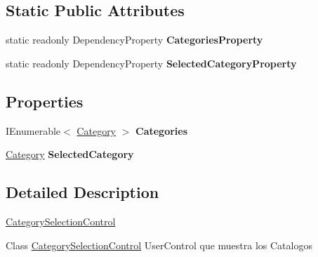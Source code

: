 \subsection*{Static Public Attributes}
\begin{DoxyCompactItemize}
\item 
static readonly Dependency\-Property {\bfseries Categories\-Property}
\item 
static readonly Dependency\-Property {\bfseries Selected\-Category\-Property}
\end{DoxyCompactItemize}
\subsection*{Properties}
\begin{DoxyCompactItemize}
\item 
\hypertarget{class_microsoft_1_1_samples_1_1_kinect_1_1_basic_interactions_1_1_category_selection_control_a0d1c37db047c0d3364ebcc52dd003e58}{I\-Enumerable$<$ \hyperlink{class_microsoft_1_1_samples_1_1_kinect_1_1_basic_interactions_1_1_category}{Category} $>$ {\bfseries Categories}}\label{class_microsoft_1_1_samples_1_1_kinect_1_1_basic_interactions_1_1_category_selection_control_a0d1c37db047c0d3364ebcc52dd003e58}

\item 
\hypertarget{class_microsoft_1_1_samples_1_1_kinect_1_1_basic_interactions_1_1_category_selection_control_a278ed98f5e21005fc479ec60b7a2b084}{\hyperlink{class_microsoft_1_1_samples_1_1_kinect_1_1_basic_interactions_1_1_category}{Category} {\bfseries Selected\-Category}}\label{class_microsoft_1_1_samples_1_1_kinect_1_1_basic_interactions_1_1_category_selection_control_a278ed98f5e21005fc479ec60b7a2b084}

\end{DoxyCompactItemize}


\subsection{Detailed Description}
\hyperlink{class_microsoft_1_1_samples_1_1_kinect_1_1_basic_interactions_1_1_category_selection_control}{Category\-Selection\-Control} 

Class \hyperlink{class_microsoft_1_1_samples_1_1_kinect_1_1_basic_interactions_1_1_category_selection_control}{Category\-Selection\-Control} User\-Control que muestra los Catalogos 

